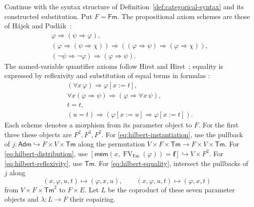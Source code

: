 \documentclass[11pt]{article}
\theoremstyle{definition}\newtheorem{definition}[theorem]{Definition}
\newcommand{\Tm}{\mathsf{Tm}}
\newcommand{\Fm}{\mathsf{Fm}}
\newcommand{\FV}{\operatorname{FV}}
\newcommand{\Adm}{\mathsf{Adm}}
\newcommand{\mem}{\mathsf{mem}}
\begin{document}
Continue with the syntax structure of
Definition~\ref{def:categorical-syntax} and its constructed substitution.
Put $F=\Fm$. The propositional axiom schemes are those of
H\'ajek and Pudl\'ak~\cite[Section 0.10]{HP}:
\begin{align}
 &\varphi\Rightarrow(\psi\Rightarrow\varphi),
                                                        \label{eq:hilbert-one}\\
 &(\varphi\Rightarrow(\psi\Rightarrow\chi))
   \Rightarrow((\varphi\Rightarrow\psi)
   \Rightarrow(\varphi\Rightarrow\chi)),
                                                        \label{eq:hilbert-two}\\
 &(\neg\psi\Rightarrow\neg\varphi)
   \Rightarrow(\varphi\Rightarrow\psi).
                                                        \label{eq:hilbert-three}
\end{align}
The named-variable quantifier axioms follow
Hirst and Hirst~\cite[Sections 2.11--2.12]{HH}; equality is expressed
by reflexivity and substitution of equal terms in formulas
\cite[Section 3.1]{HH}:
\begin{align}
 &(\forall x\,\varphi)\Rightarrow\varphi[x:=t],
                                                        \label{eq:hilbert-instantiation}\\
 &\forall x(\varphi\Rightarrow\psi)
       \Rightarrow(\varphi\Rightarrow\forall x\,\psi),
                                                        \label{eq:hilbert-distribution}\\
 &t=t,                                                   \label{eq:hilbert-reflexivity}\\
 &(u=t)\Rightarrow
       (\varphi[x:=u]\Rightarrow\varphi[x:=t]).           \label{eq:hilbert-equality}
\end{align}
Each scheme denotes a morphism from its parameter object to $F$.
For the first three these objects are $F^2,F^3,F^2$.
For \eqref{eq:hilbert-instantiation}, use the pullback of
$j:\Adm\hookrightarrow F\times V\times\Tm$ along the
permutation $V\times F\times\Tm\to F\times V\times\Tm$.
For \eqref{eq:hilbert-distribution}, use
$[\mem(x,\FV_{\Fm}(\varphi))=\mathbf{f}]
\hookrightarrow V\times F^2$.
For \eqref{eq:hilbert-reflexivity}, use $\Tm$.
For \eqref{eq:hilbert-equality}, intersect the pullbacks of $j$
along
\[
 (x,\varphi,u,t)\longmapsto(\varphi,x,u),\qquad
 (x,\varphi,u,t)\longmapsto(\varphi,x,t)
\]
from $V\times F\times\Tm^2$ to $F\times E$.
Let $L$ be the coproduct of these seven parameter objects and
$\lambda:L\to F$ their copairing.
\end{document}
